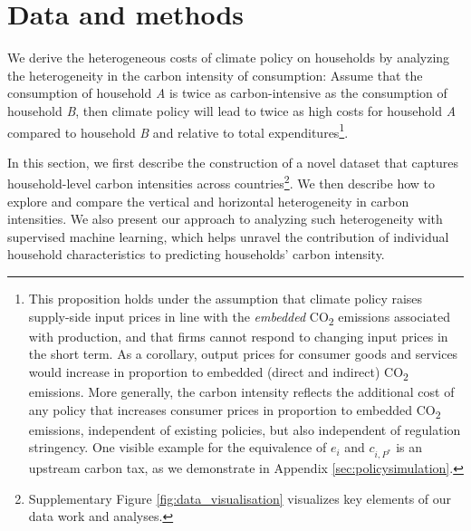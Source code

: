 \documentclass[12pt, a4paper]{article}
\begin{document}

\section{Data and methods} \label{sec:data_methods}

We derive the heterogeneous costs of climate policy on households by analyzing the heterogeneity in the carbon intensity of consumption: Assume that the consumption of household \textit{A} is twice as carbon-intensive as the consumption of household \textit{B}, then climate policy will lead to twice as high costs for household \textit{A} compared to household \textit{B} and relative to total expenditures\footnote{This proposition holds under the assumption that climate policy raises supply-side input prices in line with the \textit{embedded} CO\textsubscript{2} emissions associated with production, and that firms cannot respond to changing input prices in the short term. As a corollary, output prices for consumer goods and services would increase in proportion  to embedded (direct and indirect) CO\textsubscript{2} emissions. More generally, the carbon intensity reflects the additional cost of any policy that increases consumer prices in proportion to embedded CO\textsubscript{2} emissions, independent of existing policies, but also independent of regulation stringency. One visible example for the equivalence of $e_{i}$ and $c_{i,P^{\ast}}$ is an upstream carbon tax, as we demonstrate in Appendix \ref{sec:policysimulation}.}.

In this section, we first describe the construction of a novel dataset that captures household-level carbon intensities across countries\footnote{Supplementary Figure \ref{fig:data_visualisation} visualizes key elements of our data work and analyses.}. We then describe how to explore and compare the vertical and horizontal heterogeneity in carbon intensities. We also present our approach to analyzing such heterogeneity with supervised machine learning, which helps unravel the contribution of individual household characteristics to predicting households' carbon intensity.
\end{document}
